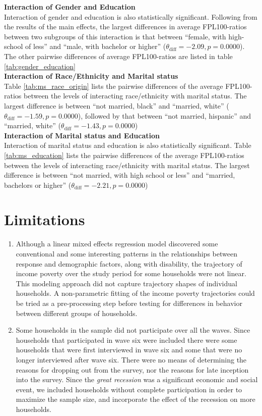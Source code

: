 \documentclass[11pt]{extarticle} %
\begin{document}
\noindent
{\bf{Interaction of Gender and Education}} \\
Interaction of gender and education is also statistically significant. Following from the results of the main effects, the largest differences in average FPL100-ratios between two subgroups of this interaction is that between ``female, with high-school of less'' and ``male, with bachelor or higher'' ($\theta_{\text{diff}} = -2.09, p = 0.0000 $). The other pairwise differences of average FPL100-ratios are listed in table \ref{tab:gender_education}\\
\noindent
{\bf{Interaction of Race/Ethnicity and Marital status}} \\
Table \ref{tab:ms_race_origin} lists the pairwise differences of the average FPL100-ratios between the levels of interacting race/ethnicity with marital status. The largest difference is between ``not married, black'' and ``married, white'' ($\theta_{\text{diff}} = -1.59, p = 0.0000 $), followed by that between ``not married, hispanic'' and ``married, white'' ($\theta_{\text{diff}} = -1.43, p = 0.0000 $) \\
\noindent
{\bf{Interaction of Marital status and Education}} \\
Interaction of marital status and education is also statistically significant. Table \ref{tab:ms_education} lists the pairwise differences of the average FPL100-ratios between the levels of interacting race/ethnicity with marital status. The largest difference is between ``not married, with high school or less'' and ``married, bachelors or higher'' ($\theta_{\text{diff}} = -2.21, p = 0.0000 $)\\


\section*{Limitations}
\begin{enumerate}
\item Although a linear mixed effects regression model discovered some conventional and some interesting patterns in the relationships between response and demographic factors, along with disability, the trajectory of income poverty over the study period for some households were not linear. This modeling approach did not capture trajectory shapes of individual households. A non-parametric fitting of the income poverty trajectories could be tried as a pre-processing step before testing for differences in behavior between different groups of households. 

\item Some households in the sample did not participate over all the waves. Since households that participated in wave six were included there were some households that were first interviewed in wave six and some that were no longer interviewed after wave six. There were no means of determining the reasons for dropping out from the survey, nor the reasons for late inception into the survey. Since the {\emph{great recession}} was a significant economic and social event, we included households without complete participation in order to maximize the sample size, and incorporate the effect of the recession on more households.
\end{enumerate}

\newpage




\newpage

\end{document}
